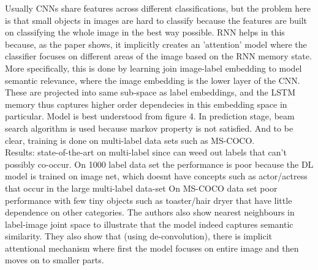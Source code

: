 \documentclass[12pt]{report}
\begin{document}
Usually CNNs share features across different classifications, but the problem here is that small objects in images are hard to classify because the features are built on classifying the whole image in the best way possible. RNN helps in this because, as the paper shows, it implicitly creates an 'attention' model where the classifier focuses on different areas of the image based on the RNN memory state. More specifically, this is done by learning join image-label embedding to model semantic relevance, where the image embedding is the lower layer of the CNN. These are projected into same sub-space as label embeddings, and the LSTM memory thus captures higher order dependecies in this embedding space in particular. Model is best understood from figure 4. In prediction stage, beam search algorithm is used because markov property is not satisfied. And to be clear, training is done on multi-label data sets such as MS-COCO. \\

Results: state-of-the-art on multi-label since can weed out labels that can't possibly co-occur. On 1000 label data set the performance is poor because the DL model is trained on image net, which doesnt have concepts such as actor/actress that occur in the large multi-label data-set On MS-COCO data set poor performance with few tiny objects such as toaster/hair dryer that have little dependence on other categories. The authors also show nearest neighbours in label-image joint space to illustrate that the model indeed captures semantic similarity. They also show that (using de-convolution), there is implicit attentional mechanism where first the model focuses on entire image and then moves on to smaller parts. \\
\end{document}
